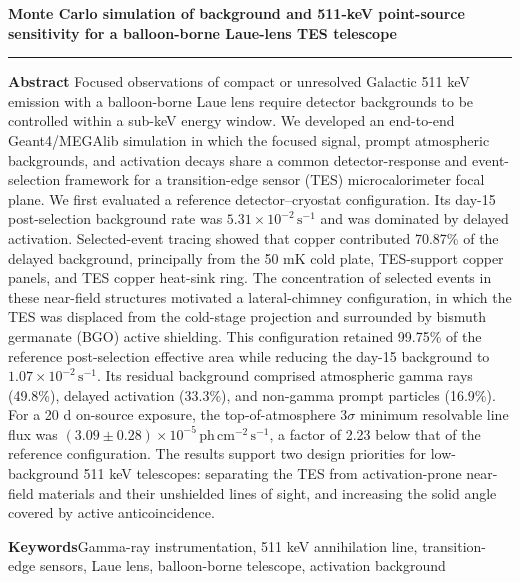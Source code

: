 \documentclass[11pt]{article}
\newcommand{\phcms}{\ensuremath{\,\mathrm{ph\,cm^{-2}\,s^{-1}}}}
\newcommand{\cps}{\ensuremath{\,\mathrm{s^{-1}}}}
\begin{document}
\thispagestyle{fancy}
\begin{flushleft}
{\LARGE\bfseries Monte Carlo simulation of background and 511-keV point-source sensitivity for a balloon-borne Laue-lens TES telescope\par}
\end{flushleft}
\vspace{0.7em}
\noindent\rule{\textwidth}{0.4pt}
\vspace{0.5em}

\noindent\textbf{Abstract}\hspace{0.7em}
Focused observations of compact or unresolved Galactic 511 keV emission with a
balloon-borne Laue lens require detector backgrounds to be controlled within a
sub-keV energy window. We developed an end-to-end Geant4/MEGAlib simulation in
which the focused signal, prompt atmospheric backgrounds, and activation decays
share a common detector-response and event-selection framework for a
transition-edge sensor (TES) microcalorimeter focal plane. We first evaluated a
reference detector--cryostat configuration. Its day-15 post-selection
background rate was $5.31\times10^{-2}\cps$ and was dominated by delayed
activation. Selected-event tracing showed that copper contributed 70.87\% of
the delayed background, principally from the 50 mK cold plate, TES-support
copper panels, and TES copper heat-sink ring. The concentration of selected
events in these near-field structures motivated a lateral-chimney
configuration, in which the TES was displaced from the
cold-stage projection and surrounded by bismuth germanate (BGO) active
shielding. This configuration retained 99.75\% of the reference post-selection
effective area while reducing the day-15 background to
$1.07\times10^{-2}\cps$. Its residual background comprised atmospheric
gamma rays (49.8\%), delayed activation (33.3\%), and non-gamma
prompt particles (16.9\%). For a 20 d on-source exposure, the top-of-atmosphere
$3\sigma$ minimum resolvable line flux was
$(3.09\pm0.28)\times10^{-5}\phcms$, a factor of 2.23 below that of the reference
configuration. The results support two design priorities for low-background
511 keV telescopes: separating the TES from activation-prone near-field
materials and their unshielded lines of sight, and increasing the solid angle
covered by active anticoincidence.

\vspace{0.7em}
\noindent\textbf{Keywords}\hspace{0.7em}Gamma-ray instrumentation, 511 keV annihilation line, transition-edge sensors, Laue lens, balloon-borne telescope, activation background
\end{document}

